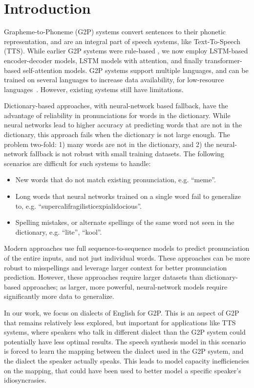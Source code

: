 \section{Introduction}
\label{sec:intro}
Grapheme-to-Phoneme (G2P) systems convert sentences to their phonetic representation, and are an integral part of speech systems, like Text-To-Speech (TTS). While earlier G2P systems were rule-based \cite{elovitz1976automatic}, we now employ LSTM-based encoder-decoder models\cite{rao2015grapheme}, LSTM models with attention\cite{peters2017massively}, and finally transformer-based self-attention models\cite{yolchuyeva2020transformer}. G2P systems support multiple languages, and can be trained on several languages to increase data availability, for low-resource languages~\cite{vesik2020model,peters2017massively}. However, existing systems still have limitations.  

Dictionary-based approaches, with neural-network based fallback, have the advantage of reliability in pronunciations for words in the dictionary. While neural networks lead to higher accuracy at predicting words that are not in the dictionary, this approach fails when the dictionary is not large enough. The problem two-fold: 1) many words are not in the dictionary, and 2) the neural-network fallback is not robust with small training datasets. The following scenarios are difficult for such systems to handle:
\begin{itemize}
\item New words that do not match existing pronunciation, e.g. ``meme''.
\item Long words that neural networks trained on a single word fail to generalize to, e.g. ``supercalifragilisticexpialidocious''.
\item Spelling mistakes, or alternate spellings of the same word not seen in the dictionary, e.g. ``lite'', ``kool''.
\end{itemize}

Modern approaches use full sequence-to-sequence models to predict pronunciation of the entire inputs, and not just individual words. These approaches can be more robust to misspellings and leverage larger context for better pronunciation prediction. However, these approaches require larger datasets than dictionary-based approaches; as larger, more powerful, neural-network models require significantly more data to generalize.

In our work, we focus on dialects of English for G2P. This is an aspect of G2P that remains relatively less explored, but important for applications like TTS systems, where speakers who talk in different dialect than the G2P system could potentially have less optimal results. The speech synthesis model in this scenario is forced to learn the mapping between the dialect used in the G2P system, and the dialect the speaker actually speaks. This leads to model capacity inefficiencies on the mapping, that could have been used to better model a specific speaker's idiosyncrasies.

